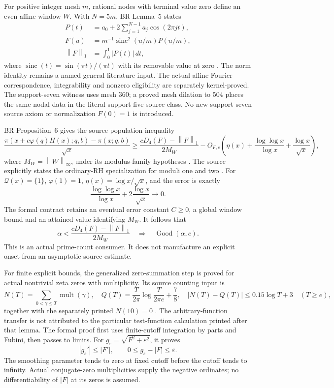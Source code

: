 \documentclass[11pt]{article}
\newcommand{\Good}{\operatorname{Good}}
\newcommand{\norm}[1]{\left\lVert#1\right\rVert}
\begin{document}
For positive integer mesh \(m\), rational nodes with terminal value zero define
an even affine window \(W\). With \(N=5m\), BR Lemma~5 states
\[
 \begin{split}
 P(t)&=a_0+2\sum_{j=1}^{N-1}a_j\cos(2\pi jt),\\
 F(u)&=m^{-1}\operatorname{sinc}^2(u/m)P(u/m),\\
 \norm F_1&=\int_0^1|P(t)|\,dt,
 \end{split}\tag{4}\label{eq:BRpair}
\]
where \(\operatorname{sinc}(t)=\sin(\pi t)/(\pi t)\) with its removable value
at zero \cite[Lemma~5, Eq.~(4), p.~3]{BR}.
The norm identity remains a named general literature input. The actual affine
Fourier correspondence, integrability and nonzero eligibility are separately
kernel-proved. The support-seven witness uses mesh \(360\); a proved mesh
dilation to \(504\) places the same nodal data in the literal support-five
source class. No new support-seven source axiom or normalization \(F(0)=1\)
is introduced.

BR Proposition~6 gives the source population inequality
\[
 \frac{\pi(x+c\varphi(q)H(x);q,b)-\pi(x;q,b)}{\sqrt{x}}
 \ge
 \frac{cD_4(F)-\norm F_1}{2M_W}
 -O_{F,c}\!\left(
 \eta(x)+\frac{\log\log x}{\log x}+\frac{\log x}{\sqrt{x}}\right),
 \tag{5}\label{eq:BRcount}
\]
where \(M_W=\norm W_\infty\), under its modulus-family hypotheses
\cite[Proposition~6, Eq.~(6), p.~7]{BR}. The source explicitly states the
ordinary-RH specialization for moduli one and two
\cite[Section~3.4, p.~10]{BR}. For \(\mathcal Q(x)=\{1\}\),
\(\varphi(1)=1\), \(\eta(x)=\log x/\sqrt{x}\), and the error is exactly
\[
 \frac{\log\log x}{\log x}+2\frac{\log x}{\sqrt{x}}\longrightarrow0.
\]
The formal contract retains an eventual error constant \(C\ge0\), a global
window bound and an attained value identifying \(M_W\). It follows that
\[
 \alpha<\frac{cD_4(F)-\norm F_1}{2M_W}
 \quad\Longrightarrow\quad\Good(\alpha,c).
 \tag{6}\label{eq:margin}
\]
This is an actual prime-count consumer. It does not manufacture an explicit
onset from an asymptotic source estimate.

For finite explicit bounds, the generalized zero-summation step is proved
for actual nontrivial zeta zeros with multiplicity. Its source counting input is
\[
 N(T)=\sum_{0<\gamma\le T}\operatorname{mult}(\gamma),\quad
 Q(T)=\frac{T}{2\pi}\log\frac{T}{2\pi e}+\frac78,\quad
 |N(T)-Q(T)|\le0.15\log T+3\quad(T\ge e),
 \tag{7}
\]
together with the separately printed \(N(10)=0\)
\cite[Section~6.1, Lemma~9 and proof, p.~23]{CMS}.
The arbitrary-function transfer is not attributed to the particular
test-function calculation printed after that lemma. The formal proof first
uses finite-cutoff integration by parts and Fubini, then passes to limits.
For \(g_\varepsilon=\sqrt{F^2+\varepsilon^2}\), it proves
\[
 |g_\varepsilon'|\le |F'|,\qquad
 0\le g_\varepsilon-|F|\le\varepsilon.
\]
The smoothing parameter tends to zero at fixed cutoff before the cutoff
tends to infinity. Actual conjugate-zero multiplicities supply the negative
ordinates; no differentiability of \(|F|\) at its zeros is assumed.
\end{document}
